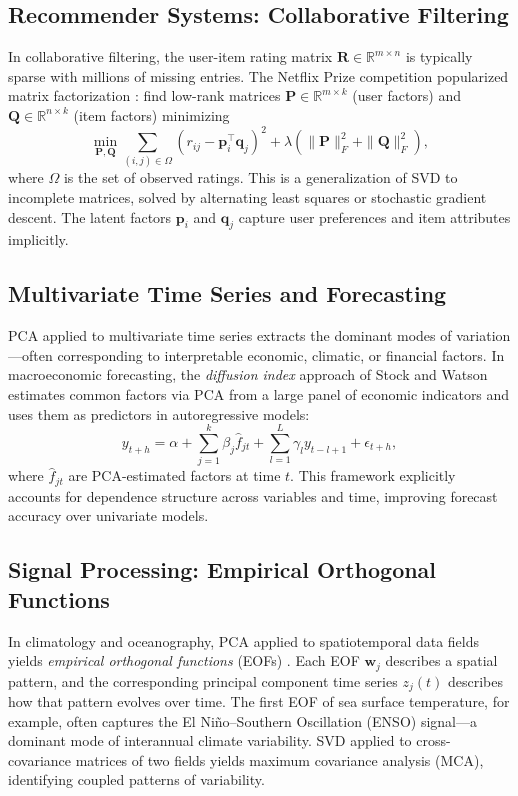 \documentclass[conference]{IEEEtran}
\begin{document}
\subsection{Recommender Systems: Collaborative Filtering}

In collaborative filtering, the user-item rating matrix $\mathbf{R} \in \mathbb{R}^{m \times n}$ is typically sparse with millions of missing entries. The Netflix Prize competition popularized matrix factorization \cite{koren2009}: find low-rank matrices $\mathbf{P} \in \mathbb{R}^{m \times k}$ (user factors) and $\mathbf{Q} \in \mathbb{R}^{n \times k}$ (item factors) minimizing
\begin{equation}
\min_{\mathbf{P},\mathbf{Q}} \sum_{(i,j)\in\Omega} (r_{ij} - \mathbf{p}_i^\top\mathbf{q}_j)^2 + \lambda(\|\mathbf{P}\|_F^2 + \|\mathbf{Q}\|_F^2),
\end{equation}
where $\Omega$ is the set of observed ratings. This is a generalization of SVD to incomplete matrices, solved by alternating least squares or stochastic gradient descent. The latent factors $\mathbf{p}_i$ and $\mathbf{q}_j$ capture user preferences and item attributes implicitly.

\subsection{Multivariate Time Series and Forecasting}

PCA applied to multivariate time series extracts the dominant modes of variation—often corresponding to interpretable economic, climatic, or financial factors. In macroeconomic forecasting, the \emph{diffusion index} approach of Stock and Watson \cite{stock2002} estimates common factors via PCA from a large panel of economic indicators and uses them as predictors in autoregressive models:
\begin{equation}
y_{t+h} = \alpha + \sum_{j=1}^k \beta_j \hat{f}_{jt} + \sum_{l=1}^L \gamma_l y_{t-l+1} + \epsilon_{t+h},
\end{equation}
where $\hat{f}_{jt}$ are PCA-estimated factors at time $t$. This framework explicitly accounts for dependence structure across variables and time, improving forecast accuracy over univariate models.

\subsection{Signal Processing: Empirical Orthogonal Functions}

In climatology and oceanography, PCA applied to spatiotemporal data fields yields \emph{empirical orthogonal functions} (EOFs) \cite{lorenz1956}. Each EOF $\mathbf{w}_j$ describes a spatial pattern, and the corresponding principal component time series $z_j(t)$ describes how that pattern evolves over time. The first EOF of sea surface temperature, for example, often captures the El Ni\~{n}o--Southern Oscillation (ENSO) signal—a dominant mode of interannual climate variability. SVD applied to cross-covariance matrices of two fields yields maximum covariance analysis (MCA), identifying coupled patterns of variability.
\end{document}
